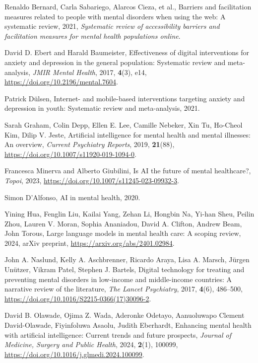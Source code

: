\documentclass[journal]{IEEEtran}
\begin{document}
\begin{thebibliography}{99}

Renaldo Bernard, Carla Sabariego, Alarcos Cieza, et al.,
Barriers and facilitation measures related to people with mental disorders when using the web: A systematic review,
2021,
\textit{Systematic review of accessibility barriers and facilitation measures for mental health populations online}.

David D. Ebert and Harald Baumeister,
Effectiveness of digital interventions for anxiety and depression in the general population: Systematic review and meta-analysis,
\textit{JMIR Mental Health}, 2017, \textbf{4}(3), e14,
\url{https://doi.org/10.2196/mental.7604}.

Patrick Dülsen,
Internet- and mobile-based interventions targeting anxiety and depression in youth: Systematic review and meta-analysis,
2021.

Sarah Graham, Colin Depp, Ellen E. Lee, Camille Nebeker, Xin Tu, Ho-Cheol Kim, Dilip V. Jeste,
Artificial intelligence for mental health and mental illnesses: An overview,
\textit{Current Psychiatry Reports}, 2019, \textbf{21}(88),
\url{https://doi.org/10.1007/s11920-019-1094-0}.

Francesca Minerva and Alberto Giubilini,
Is AI the future of mental healthcare?,
\textit{Topoi}, 2023,
\url{https://doi.org/10.1007/s11245-023-09932-3}.

Simon D'Alfonso,
AI in mental health,
2020.

Yining Hua, Fenglin Liu, Kailai Yang, Zehan Li, Hongbin Na, Yi-han Sheu, Peilin Zhou, Lauren V. Moran, Sophia Ananiadou, David A. Clifton, Andrew Beam, John Torous,
Large language models in mental health care: A scoping review,
2024,
arXiv preprint,
\url{https://arxiv.org/abs/2401.02984}.

John A. Naslund, Kelly A. Aschbrenner, Ricardo Araya, Lisa A. Marsch, Jürgen Unützer, Vikram Patel, Stephen J. Bartels,
Digital technology for treating and preventing mental disorders in low-income and middle-income countries: A narrative review of the literature,
\textit{The Lancet Psychiatry}, 2017, \textbf{4}(6), 486--500,
\url{https://doi.org/10.1016/S2215-0366(17)30096-2}.

David B. Olawade, Ojima Z. Wada, Aderonke Odetayo, Aanuoluwapo Clement David-Olawade, Fiyinfoluwa Asaolu, Judith Eberhardt,
Enhancing mental health with artificial intelligence: Current trends and future prospects,
\textit{Journal of Medicine, Surgery and Public Health}, 2024, \textbf{2}(1), 100099,
\url{https://doi.org/10.1016/j.glmedi.2024.100099}.


\end{thebibliography}
\end{document}
